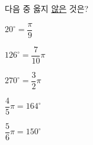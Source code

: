 다음 중 옳지 \underline{않은} 것은?
\begin{choices32}{\rule[-3ex]{0pt}{8ex}$20^\circ=\dfrac{\pi}{9}$}{\rule[-3ex]{0pt}{8ex}$126^\circ=\dfrac{7}{10}\pi$}{\rule[-3ex]{0pt}{8ex}$270^\circ=\dfrac{3}{2}\pi$}{\rule[-3ex]{0pt}{8ex}$\dfrac{4}{5}\pi=164^\circ$}{\rule[-3ex]{0pt}{8ex}$\dfrac{5}{6}\pi=150^\circ$}\end{choices32}
